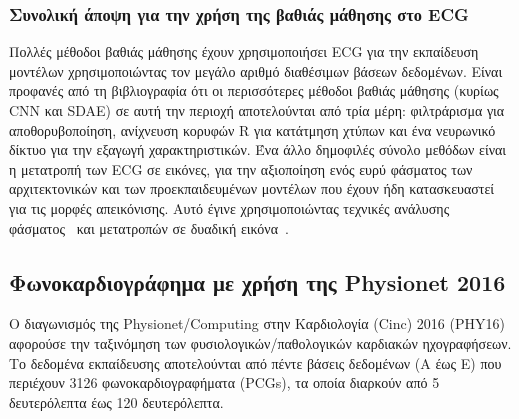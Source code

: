 \subsubsection{Συνολική άποψη για την χρήση της βαθιάς μάθησης στο ECG}
Πολλές μέθοδοι βαθιάς μάθησης έχουν χρησιμοποιήσει ECG για την εκπαίδευση μοντέλων χρησιμοποιώντας τον μεγάλο αριθμό διαθέσιμων βάσεων δεδομένων.
Είναι προφανές από τη βιβλιογραφία ότι οι περισσότερες μέθοδοι βαθιάς μάθησης (κυρίως CNN και SDAE) σε αυτή την περιοχή αποτελούνται από τρία μέρη: φιλτράρισμα για αποθορυβοποίηση, ανίχνευση κορυφών R για κατάτμηση χτύπων και ένα νευρωνικό δίκτυο για την εξαγωγή χαρακτηριστικών.
Ένα άλλο δημοφιλές σύνολο μεθόδων είναι η μετατροπή των ECG σε εικόνες, για την αξιοποίηση ενός ευρύ φάσματος των αρχιτεκτονικών και των προεκπαιδευμένων μοντέλων που έχουν ήδη κατασκευαστεί για τις μορφές απεικόνισης.
Αυτό έγινε χρησιμοποιώντας τεχνικές ανάλυσης φάσματος~\cite{luo2017patient, xia2018detecting} και μετατροπών σε δυαδική εικόνα~\cite{xiao2018monitoring, liu2018detecting, isin2017cardiac}.

\subsection{Φωνοκαρδιογράφημα με χρήση της Physionet 2016}
Ο διαγωνισμός της Physionet/Computing στην Καρδιολογία (Cinc) 2016 (PHY16) αφορούσε την ταξινόμηση των φυσιολογικών/παθολογικών καρδιακών ηχογραφήσεων.
Το δεδομένα εκπαίδευσης αποτελούνται από πέντε βάσεις δεδομένων (Α έως Ε) που περιέχουν 3126 φωνοκαρδιογραφήματα (PCGs), τα οποία διαρκούν από 5 δευτερόλεπτα έως 120 δευτερόλεπτα.


